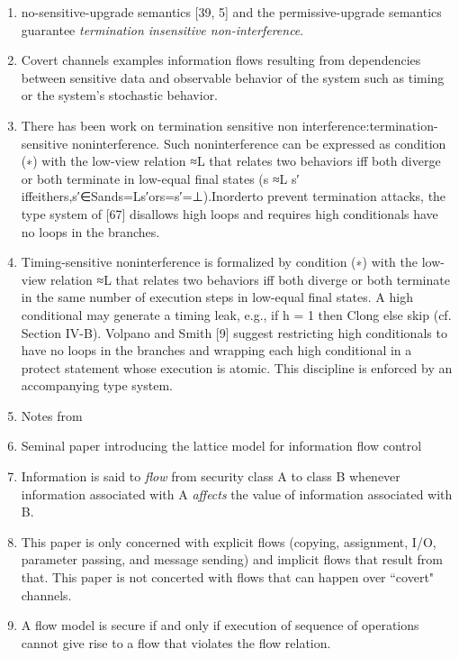 \documentclass[11pt,letterpaper]{article}
\begin{document}
\begin{enumerate}
  \item  no-sensitive-upgrade semantics [39, 5] and the permissive-upgrade semantics guarantee \textit{termination insensitive non-interference}.

  \item Covert channels examples information flows resulting from dependencies between sensitive data and observable behavior of the system such as timing or the system’s stochastic behavior.

  \item There has been work on termination sensitive non interference:termination-sensitive noninterference. Such noninterference can be expressed as condition (∗) with the low-view relation ≈L that relates two behaviors iff both diverge or both terminate in low-equal final states (s ≈L s′ iffeithers,s′∈Sands=Ls′ors=s′=⊥).Inorderto prevent termination attacks, the type system of [67] disallows high loops and requires high conditionals have no loops in the branches.

  \item Timing-sensitive noninterference is formalized by condition (∗) with the low-view relation ≈L that relates two behaviors iff both diverge or both terminate in the same number of execution steps in low-equal final states. A high conditional may generate a timing leak, e.g., if h = 1 then Clong else skip (cf. Section IV-B). Volpano and Smith [9] suggest restricting high conditionals to have no loops in the branches and wrapping each high conditional in a protect statement whose execution is atomic. This discipline is enforced by an accompanying type system.

\item Notes from \cite{denning1976lattice}
\item Seminal paper introducing the lattice model for information flow control
\item Information is said to \textit{flow} from security class A to class B whenever  information associated with A \textit{affects} the value of information associated with B.

\item This paper is only concerned with explicit flows (copying, assignment, I/O, parameter passing, and message sending) and implicit flows that result from that. This paper is not concerted with flows that can happen over ``covert" channels.

\item A flow model is secure if and only if execution of sequence of operations cannot give rise to a flow that violates the flow relation.


\end{enumerate}
\end{document}
